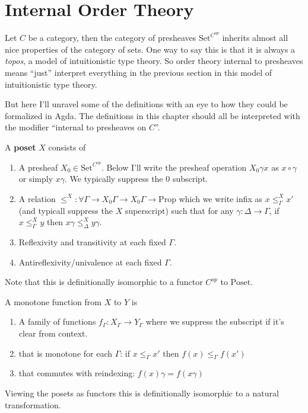 \documentclass{article}
\newcommand{\Poset}{\textrm{Poset}}
\newcommand{\Set}{\textrm{Set}}
\newcommand{\Prop}{\textrm{Prop}}
\begin{document}
\section{Internal Order Theory}

Let $C$ be a category, then the category of presheaves $\Set^{C^{op}}$
inherits almost all nice properties of the category of sets. One way
to say this is that it is always a \emph{topos}, a model of
intuitionistic type theory. So order theory internal to presheaves
means ``just'' interpret everything in the previous section in this
model of intuitionistic type theory.

But here I'll unravel some of the definitions with an eye to how they
could be formalized in Agda. The definitions in this chapter should
all be interpreted with the modifier ``internal to presheaves on
$C$''.

A \textbf{poset} $X$ consists of
\begin{enumerate}
\item A presheaf $X_0 \in \Set^{C^{op}}$. Below I'll write the
  presheaf operation $X_0 \gamma x$ as $x \circ \gamma$ or simply
  $x\gamma$. We typically suppress the $0$ subscript.
\item A relation $\leq^X : \forall \Gamma \to X_0 \Gamma \to X_0\Gamma
  \to \Prop$ which we write infix as $x \leq^X_\Gamma x'$ (and
  typicall suppress the $X$ superscript) such that for any $\gamma :
  \Delta \to \Gamma$, if $x \leq_\Gamma^X y$ then $x\gamma
  \leq_\Delta^X y\gamma$.
\item Reflexivity and transitivity at each fixed $\Gamma$.
\item Antireflexivity/univalence at each fixed $\Gamma$.
\end{enumerate}
Note that this is definitionally isomorphic to a functor $C^{op}$ to
$\Poset$.

A monotone function from $X$ to $Y$ is
\begin{enumerate}
\item A family of functions $f_\Gamma : X_\Gamma \to Y_\Gamma$ where
  we suppress the subscript if it's clear from context.
\item that is monotone for each $\Gamma$: if $x \leq_\Gamma x'$ then $f(x) \leq_\Gamma f(x')$
\item that commutes with reindexing: $f(x)\gamma = f(x\gamma)$
\end{enumerate}
Viewing the posets as functors this is definitionally isomorphic to a
natural transformation.
\end{document}
